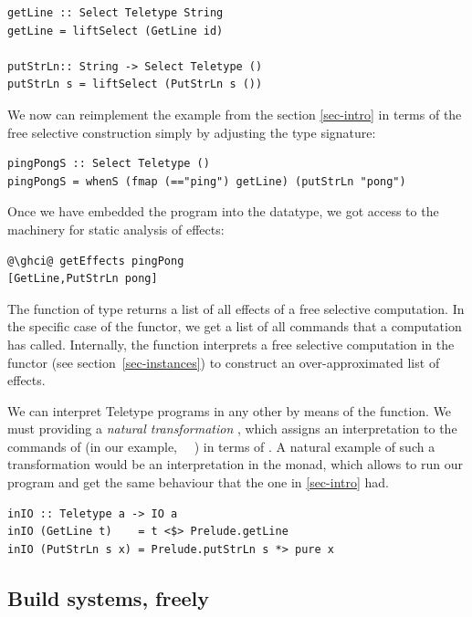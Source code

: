 \begin{verbatim}
getLine :: Select Teletype String
getLine = liftSelect (GetLine id)

putStrLn:: String -> Select Teletype ()
putStrLn s = liftSelect (PutStrLn s ())
\end{verbatim}

We now can reimplement the  example from the section \ref{sec-intro}
in terms of the free selective construction simply by adjusting the type signature:

\begin{verbatim}
pingPongS :: Select Teletype ()
pingPongS = whenS (fmap (=="ping") getLine) (putStrLn "pong")
\end{verbatim}

Once we have embedded the  program into the  datatype,
we got access to the machinery for static analysis of effects:

\begin{verbatim}
@\ghci@ getEffects pingPong
[GetLine,PutStrLn pong]
\end{verbatim}

The  function of type 
returns a list of all effects of a free selective computation. In the specific case of
the  functor, we get a list of all commands that a computation has called.
Internally, the  function interprets a free selective computation
in the  functor (see section~\ref{sec-instances}) to construct an over-approximated
list of effects.

We can interpret Teletype programs in any other  by means of the
 function. We must providing a \emph{natural transformation}
, which assigns an interpretation to the commands of
 (in our example, ~\hs{=}~) in terms of .
A natural example of such a transformation would be an interpretation in the  monad,
which allows to run our  program and get the same behaviour that the
one in \ref{sec-intro} had.

\begin{verbatim}
inIO :: Teletype a -> IO a
inIO (GetLine t)    = t <$> Prelude.getLine
inIO (PutStrLn s x) = Prelude.putStrLn s *> pure x
\end{verbatim}

\subsection{Build systems, freely}\label{sec-free-build}

